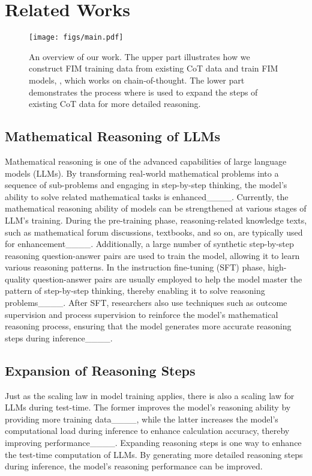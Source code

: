 \section{Related Works}
\begin{figure*}[htbp]
\centering
\texttt{[image: figs/main.pdf]}
\caption{An overview of our work. The upper part illustrates how we construct FIM training data from existing CoT data and train FIM models, \methodname, which works on chain-of-thought. The lower part demonstrates the process where \methodname is used to expand the steps of existing CoT data for more detailed reasoning.}
\label{fig:main}
\end{figure*}


\subsection{Mathematical Reasoning of LLMs}

Mathematical reasoning is one of the advanced capabilities of large language models (LLMs). By transforming real-world mathematical problems into a sequence of sub-problems and engaging in step-by-step thinking, the model’s ability to solve related mathematical tasks is enhanced____. Currently, the mathematical reasoning ability of models can be strengthened at various stages of LLM’s training. During the pre-training phase, reasoning-related knowledge texts, such as mathematical forum discussions, textbooks, and so on, are typically used for enhancement____. Additionally, a large number of synthetic step-by-step reasoning question-answer pairs are used to train the model, allowing it to learn various reasoning patterns. In the instruction fine-tuning (SFT) phase, high-quality question-answer pairs are usually employed to help the model master the pattern of step-by-step thinking, thereby enabling it to solve reasoning problems____. After SFT, researchers also use techniques such as outcome supervision and process supervision to reinforce the model's mathematical reasoning process, ensuring that the model generates more accurate reasoning steps during inference____.



\subsection{Expansion of Reasoning Steps}
Just as the scaling law in model training applies, there is also a scaling law for LLMs during test-time. The former improves the model’s reasoning ability by providing more training data____, while the latter increases the model’s computational load during inference to enhance calculation accuracy, thereby improving performance____. Expanding reasoning steps is one way to enhance the test-time computation of LLMs. By generating more detailed reasoning steps during inference, the model’s reasoning performance can be improved.

